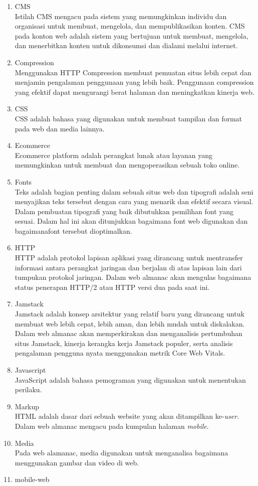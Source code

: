 \begin{enumerate}
	\item CMS\\
	Istilah CMS mengacu pada sistem yang memungkinkan individu dan organisasi untuk membuat, mengelola, dan mempublikasikan konten. CMS pada konton web adalah sistem yang bertujuan untuk membuat, mengelola, dan menerbitkan konten untuk dikonsumsi dan dialami melalui internet.
	\item Compression\\
	Menggunakan HTTP Compression membuat pemuatan situs lebih cepat dan menjamin pengalaman penggunaan yang lebih baik. Penggunaan compression yang efektif dapat mengurangi berat halaman dan meningkatkan kinerja web.
	\item CSS\\
	CSS adalah bahasa yang digunakan untuk membuat tampilan dan format pada web dan media lainnya.
	\item Ecommerce\\
	Ecommerce platform adalah perangkat lunak atau layanan yang memungkinkan untuk membuat dan mengoperasikan sebuah toko online.
	\item Fonts\\
	Teks adalah bagian penting dalam sebuah situs web dan tipografi adalah seni menyajikan teks tersebut dengan cara yang menarik dan efektif secara visual. Dalam pembuatan tipografi yang baik dibutuhkan pemilihan font yang sesuai. Dalam hal ini akan ditunjukkan bagaimana font web digunakan dan bagaimanafont tersebut dioptimalkan. 
	\item HTTP\\
	HTTP adalah protokol lapisan aplikasi yang dirancang untuk mentransfer informasi antara perangkat jaringan dan berjalan di atas lapisan lain dari tumpukan protokol jaringan. Dalam web almanac akan mengulas bagaimana status penerapan HTTP/2 atau HTTP versi dua pada saat ini.
	\item Jamstack\\
	Jamstack adalah konsep arsitektur yang relatif baru yang dirancang untuk membuat web lebih cepat, lebih aman, dan lebih mudah untuk diskalakan. Dalam web almanac akan memperkirakan dan menganalisis pertumbuhan situs Jamstack, kinerja kerangka kerja Jamstack populer, serta analisis pengalaman pengguna nyata menggunakan metrik Core Web Vitals.
	\item Javascript\\
	JavaScript adalah bahasa pemograman yang digunakan untuk menentukan perilaku. 
	\item Markup\\
	HTML adalah dasar dari sebuah website yang akan ditampilkan ke-\textit{user}. Dalam web almanac mengacu pada kumpulan halaman \textit{mobile}.
	\item Media\\
	Pada web alamanac, media digunakan untuk menganalisa bagaimana menggunakan gambar dan video di web.
	\item mobile-web
	

\end{enumerate}
